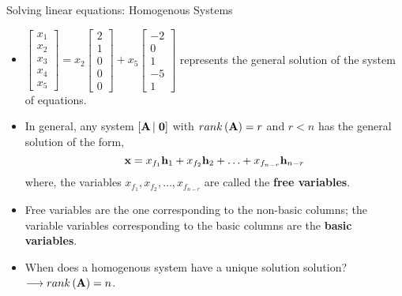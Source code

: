 \documentclass[aspectratio=169]{beamer}
\def\mf{\ensuremath\mathbf}
\begin{document}
\begin{frame}[t]{Solving linear equations: Homogenous Systems}
\begin{small}
\begin{itemize}
    \item $\begin{bmatrix}x_1\\ x_2\\ x_3\\ x_4\\ x_5\end{bmatrix} = x_2\begin{bmatrix}2\\ 1\\ 0\\ 0\\ 0\end{bmatrix} + x_5\begin{bmatrix}-2\\ 0\\ 1\\ -5\\ 1\end{bmatrix}$ represents the general solution of the system of equations.

    \item In general, any system $\left[ \mf{A} \left|\right.\mf{0}\right]$ with $rank\left(\mf{A}\right) = r$ and $r < n$ has the general solution of the form,
    \[ \mf{x} = x_{f_1} \mf{h}_1 + x_{f_2} \mf{h}_2 + \ldots + x_{f_{n-r}} \mf{h}_{n-r} \]
    where,  the variables $x_{f_1}, x_{f_2}, \ldots , x_{f_{n-r}}$ are called the \textbf{free variables}.
    \item Free variables are the one corresponding to the non-basic columns; the variable variables corresponding to the basic columns are the \textbf{basic variables}.
    \item When does a homogenous system have a unique solution solution? $\longrightarrow rank\left(\mf{A}\right) = n$.
\end{itemize}
\end{small}
\end{frame}
\end{document}
